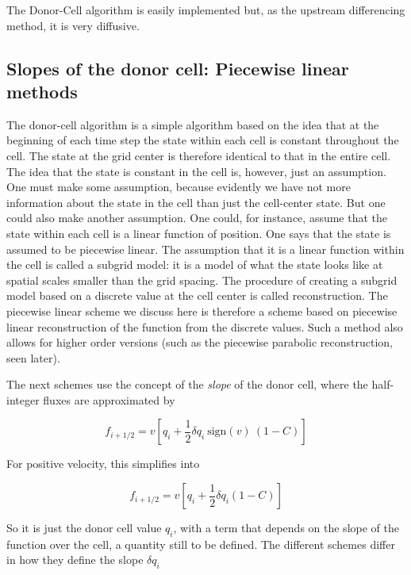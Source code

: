 The Donor-Cell algorithm is easily implemented
but, as the upstream differencing method, it is very diffusive.

\subsection{Slopes of the donor cell: Piecewise linear methods}

The donor-cell algorithm is a simple algorithm based on the idea that at the beginning of each
time step the state within each cell is constant throughout the cell. The state at the grid
center is therefore identical to that in the entire cell. The idea that the state is constant in the cell
is, however, just an assumption. One must make some assumption, because evidently we have
not more information about the state in the cell than just the cell-center state. But one could
also make another assumption. One could, for instance, assume that the state within each cell
is a linear function of position. One says that the state is assumed to be piecewise linear. The assumption that it is a linear function within the cell is called a subgrid model: it is
a model of what the state looks like at spatial scales smaller than the grid spacing. The procedure
of creating a subgrid model based on a discrete value at the cell
center is called reconstruction. The piecewise linear scheme we discuss here is therefore a scheme based on piecewise linear
reconstruction of the function from the discrete values. Such a method
also allows for higher order versions (such as the piecewise parabolic reconstruction, seen later). 

The next schemes use the concept of the {\it slope} of the donor cell, where the half-integer fluxes are approximated by 

\begin{equation}
f_{i+1/2} = v\left[ q_{i} + \frac{1}{2}\delta q_i \ \mbox{sign}(v) \ (1-C) \right]
\end{equation}


For positive velocity, this simplifies into 

\begin{equation}
f_{i+1/2} = v\left[ q_{i} + \frac{1}{2}\delta q_i (1-C) \right]
\end{equation}

So it is just the donor cell value $q_{i}$, with a term that depends on the slope of the function over the cell, a quantity still to be defined. The different schemes differ in how they define the slope $\delta q_i$

